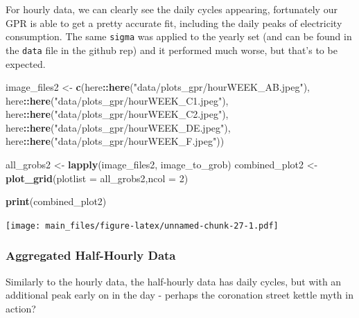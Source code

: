 \documentclass[
]{article}
\newenvironment{Shaded}{\begin{snugshade}}{\end{snugshade}}
\newcommand{\AttributeTok}[1]{\textcolor[rgb]{0.13,0.29,0.53}{#1}}
\newcommand{\DecValTok}[1]{\textcolor[rgb]{0.00,0.00,0.81}{#1}}
\newcommand{\FunctionTok}[1]{\textcolor[rgb]{0.13,0.29,0.53}{\textbf{#1}}}
\newcommand{\NormalTok}[1]{#1}
\newcommand{\OtherTok}[1]{\textcolor[rgb]{0.56,0.35,0.01}{#1}}
\newcommand{\SpecialCharTok}[1]{\textcolor[rgb]{0.81,0.36,0.00}{\textbf{#1}}}
\newcommand{\StringTok}[1]{\textcolor[rgb]{0.31,0.60,0.02}{#1}}
\begin{document}
For hourly data, we can clearly see the daily cycles appearing,
fortunately our GPR is able to get a pretty accurate fit, including the
daily peaks of electricity consumption. The same \texttt{sigma} was
applied to the yearly set (and can be found in the \texttt{data} file in
the github rep) and it performed much worse, but that's to be expected.

\begin{Shaded}
\begin{Highlighting}[]
\NormalTok{image\_files2 }\OtherTok{\textless{}{-}} \FunctionTok{c}\NormalTok{(here}\SpecialCharTok{::}\FunctionTok{here}\NormalTok{(}\StringTok{"data/plots\_gpr/hourWEEK\_AB.jpeg"}\NormalTok{),}
\NormalTok{                  here}\SpecialCharTok{::}\FunctionTok{here}\NormalTok{(}\StringTok{"data/plots\_gpr/hourWEEK\_C1.jpeg"}\NormalTok{),}
\NormalTok{                  here}\SpecialCharTok{::}\FunctionTok{here}\NormalTok{(}\StringTok{"data/plots\_gpr/hourWEEK\_C2.jpeg"}\NormalTok{),}
\NormalTok{                  here}\SpecialCharTok{::}\FunctionTok{here}\NormalTok{(}\StringTok{"data/plots\_gpr/hourWEEK\_DE.jpeg"}\NormalTok{),}
\NormalTok{                  here}\SpecialCharTok{::}\FunctionTok{here}\NormalTok{(}\StringTok{"data/plots\_gpr/hourWEEK\_F.jpeg"}\NormalTok{))}


\NormalTok{all\_grobs2 }\OtherTok{\textless{}{-}} \FunctionTok{lapply}\NormalTok{(image\_files2, image\_to\_grob)}
\NormalTok{combined\_plot2 }\OtherTok{\textless{}{-}} \FunctionTok{plot\_grid}\NormalTok{(}\AttributeTok{plotlist =}\NormalTok{ all\_grobs2,}\AttributeTok{ncol =} \DecValTok{2}\NormalTok{)}

\FunctionTok{print}\NormalTok{(combined\_plot2)}
\end{Highlighting}
\end{Shaded}

\texttt{[image: main\_files/figure-latex/unnamed-chunk-27-1.pdf]}

\hypertarget{aggregated-half-hourly-data}{%
\subsubsection{Aggregated Half-Hourly
Data}\label{aggregated-half-hourly-data}}

Similarly to the hourly data, the half-hourly data has daily cycles, but
with an additional peak early on in the day - perhaps the coronation
street kettle myth in action?
\end{document}
